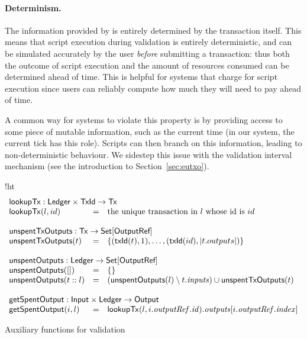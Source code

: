 \paragraph{Determinism.}
The information provided by \ctx{} is entirely determined by the
transaction itself. This means that script execution during validation
is entirely deterministic, and can be simulated accurately by the user
\emph{before} submitting a transaction: thus both the outcome of
script execution and the amount of resources consumed can be
determined ahead of time. This is helpful for systems that charge for
script execution since users can reliably compute how much they will
need to pay ahead of time.

A common way for systems to violate this property is by providing
access to some piece of mutable information, such as the current time
(in our system, the current tick has this role). Scripts can then
branch on this information, leading to non-deterministic behaviour. We
sidestep this issue with the validation interval mechanism (see the
introduction to Section~\ref{sec:eutxo}).

\begin{ruledfigure}{!ht}
  \begin{displaymath}
  \begin{array}{lll}
  \multicolumn{3}{l}{\lookupTx : \s{Ledger} \times \TxId \rightarrow \eutxotx{}}\\
  \lookupTx(l,id) &=& \textrm{the unique transaction in $l$ whose id is $id$}\\
  \\
  \multicolumn{3}{l}{\txunspent : \eutxotx \rightarrow \Set{\s{OutputRef}}}\\
  \txunspent(t) &=& \{(\txId(t),1), \ldots, (\txId(id),\left|t.outputs\right|)\}\\
  \\
  \multicolumn{3}{l}{\unspent : \s{Ledger} \rightarrow \Set{\s{OutputRef}}}\\
  \unspent([]) &=& \emptymap \\
  \unspent(t::l) &=& (\unspent(l) \setminus t.\inputs) \cup \txunspent(t)\\
  \\
  \multicolumn{3}{l}{\getSpent : \s{Input} \times \s{Ledger} \rightarrow \s{Output}}\\
  \getSpent(i,l) &=& \lookupTx(l, i.\outputref.\id).\outputs[i.\outputref.\idx]
  \end{array}
  \end{displaymath}
  \caption{Auxiliary functions for \EUTXO{} validation}
  \label{fig:validation-functions-1}
\end{ruledfigure}


